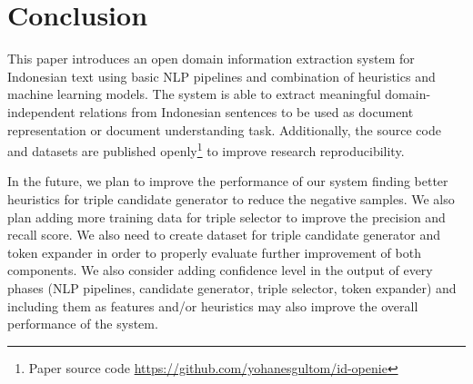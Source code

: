 \documentclass[conference,compsoc,12pt]{IEEEtran}
\begin{document}
\section{Conclusion}

This paper introduces an open domain information extraction system for Indonesian text using basic NLP pipelines and combination of heuristics and machine learning models. The system is able to extract meaningful domain-independent relations from Indonesian sentences to be used as document representation or document understanding task. Additionally, the source code and datasets are published openly\footnote{Paper source code \url{https://github.com/yohanesgultom/id-openie}} to improve research reproducibility.

In the future, we plan to improve the performance of our system finding better heuristics for triple candidate generator to reduce the negative samples. We also plan adding more training data for triple selector to improve the precision and recall score. We also need to create dataset for triple candidate generator and token expander in order to properly evaluate further improvement of both components. We also consider adding confidence level in the output of every phases (NLP pipelines, candidate generator, triple selector, token expander) and including them as features and/or heuristics may also improve the overall performance of the system.






\end{document}
